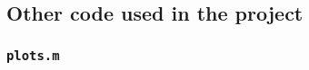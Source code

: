 \subsection{Other code used in the project}\label{app:other}

\subsubsection{\texttt{plots.m}}\label{app:other:matlab}
\inputminted{matlab}{Code/plots.m}